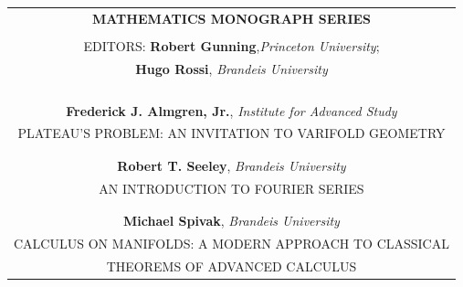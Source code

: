 \thispagestyle{empty}
\vspace*{\fill}
\label{CopyRight}
%
\begin{center}
    \begin{tabular}{c}
        \textbf{MATHEMATICS MONOGRAPH SERIES} \\\\
        EDITORS: \textbf{Robert Gunning},\textit{Princeton University};\\
        \textbf{Hugo Rossi}, \textit{Brandeis University}
        \\\\\\\\\\
        \textbf{Frederick J. Almgren, Jr.}, \textit{Institute for Advanced Study}\\
        PLATEAU'S PROBLEM: AN INVITATION TO VARIFOLD GEOMETRY\\
        \\\\
        \textbf{Robert T. Seeley}, \textit{Brandeis University}\\
        AN INTRODUCTION TO FOURIER SERIES\\
        \\\\
        \textbf{Michael Spivak}, \textit{Brandeis University}\\
        CALCULUS ON MANIFOLDS: A MODERN APPROACH TO CLASSICAL\\
        THEOREMS OF ADVANCED CALCULUS
    \end{tabular}
\end{center}
\vspace*{\fill}
\newpage


